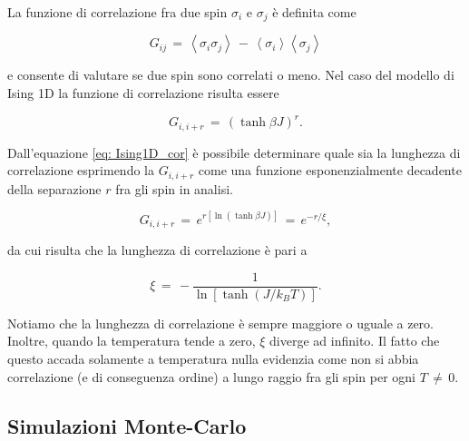 La funzione di correlazione fra due spin $\sigma_i$ e $\sigma_j$ è definita come

\begin{equation}
    G_{ij}\,=\,\left<\sigma_i \sigma_j\right>\,-\,\left<\sigma_i\right>\left<\sigma_j\right>
    \label{eq: def_corr_fun_Ising1D}
\end{equation}

e consente di valutare se due spin sono correlati o meno. Nel caso del modello di Ising 1D la funzione di correlazione 
risulta essere

\begin{equation}
    G_{i, i+r}\,=\,\left(\tanh{\beta J}\right)^r.
    \label{eq: Ising1D_cor}
\end{equation}

Dall'equazione \eqref{eq: Ising1D_cor} è possibile determinare quale sia la lunghezza di correlazione esprimendo la 
$G_{i, i+r}$ come una funzione esponenzialmente decadente della separazione $r$ fra gli spin in analisi. 

\begin{equation}
    G_{i, i+r}\,=\,e^{r\left[\ln{\left(\tanh{\beta J}\right)}\right]}\,=\,e^{-r/\xi},
    \label{eq: Ising1D_corr_exp}
\end{equation}

da cui risulta che la lunghezza di correlazione è pari a 

\begin{equation}
    \xi\,=\,-\frac{1}{\ln{\left[\tanh{\left(J/k_B T\right)}\right]}}.
    \label{eq: lungh_corr}
\end{equation}

Notiamo che la lunghezza di correlazione è sempre maggiore o uguale a zero. Inoltre, quando la temperatura tende a zero, 
$\xi$ diverge ad infinito. Il fatto che questo accada solamente a temperatura nulla evidenzia come non si abbia correlazione 
(e di conseguenza ordine) a lungo raggio fra gli spin per ogni $T\,\neq\,0$.





\subsection{Simulazioni Monte-Carlo}

